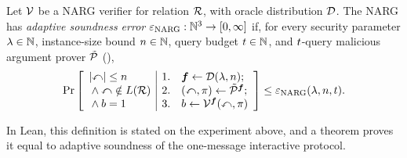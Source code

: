 \begin{definition}
  \label{def:narg_adaptive_soundness}
  Let \(\mathcal{V}\) be a NARG verifier for relation \(\mathcal{R}\), with oracle distribution \(\mathcal{D}\). The NARG has \emph{adaptive soundness error} \(\varepsilon_{\mathrm{NARG}}:\mathbb N^3\to[0,\infty]\) if, for every security parameter \(\lambda\in\mathbb N\), instance-size bound \(n\in\mathbb N\), query budget \(t\in\mathbb N\), and \(t\)-query malicious argument prover \(\tilde{\mathcal{P}}\) (),
  \begin{equation*}
  \Pr\left[\begin{array}{l|rl}
    |\mathbb{x}|\le n
      & 1. & \boldsymbol{f}\leftarrow\mathcal{D}(\lambda,n);\\
    {}\land\mathbb{x}\notin L(\mathcal{R})
      & 2. & (\mathbb{x},\pi)\leftarrow\tilde{\mathcal{P}}^{\boldsymbol{f}};\\
    {}\land b=1
      & 3. & b\leftarrow\mathcal{V}^{\boldsymbol{f}}(\mathbb{x},\pi)
  \end{array}\right]\le\varepsilon_{\mathrm{NARG}}(\lambda,n,t).
  \end{equation*}

  In Lean, this definition is stated on the experiment above, and a theorem proves it equal to adaptive soundness of the one-message interactive protocol.
  \leanok
\end{definition}

